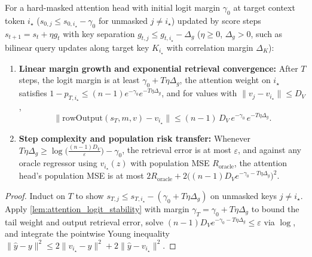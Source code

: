 \begin{lemma}\label{lem:in_context_retrieval}
\leanok
{}
For a hard-masked attention head with initial logit margin $\gamma_0$ at target context token $i_\star$ ($s_{0,j} \le s_{0,i_\star} - \gamma_0$ for unmasked $j\ne i_\star$) updated by score steps $s_{t+1} = s_t + \eta g_t$ with key separation $g_{t,j} \le g_{t,i_\star} - \Delta_g$ ($\eta\ge 0$, $\Delta_g > 0$, such as bilinear query updates along target key $K_{i_\star}$ with correlation margin $\Delta_K$):
\begin{enumerate}
\item \textbf{Linear margin growth and exponential retrieval convergence:} After $T$ steps, the logit margin is at least $\gamma_0 + T\eta\Delta_g$, the attention weight on $i_\star$ satisfies $1 - p_{T,i_\star} \le (n-1)e^{-\gamma_0}e^{-T\eta\Delta_g}$, and for values with $\|v_j - v_{i_\star}\|\le D_V$,
\[
\bigl\|\mathrm{rowOutput}(s_T, m, v) - v_{i_\star}\bigr\| \le (n-1)\,D_V\,e^{-\gamma_0}\,e^{-T\eta\Delta_g}.
\]
\item \textbf{Step complexity and population risk transfer:} Whenever $T\eta\Delta_g \ge \log\bigl(\frac{(n-1)D_V}{\varepsilon}\bigr) - \gamma_0$, the retrieval error is at most $\varepsilon$, and against any oracle regressor using $v_{i_\star}(z)$ with population MSE $R_{\mathrm{oracle}}$, the attention head's population MSE is at most $2 R_{\mathrm{oracle}} + 2\bigl((n-1)D_V e^{-\gamma_0 - T\eta\Delta_g}\bigr)^2$.
\end{enumerate}
\end{lemma}
\begin{proof}
\leanok
Induct on $T$ to show $s_{T,j} \le s_{T,i_\star} - (\gamma_0 + T\eta\Delta_g)$ on unmasked keys $j\ne i_\star$. Apply \cref{lem:attention_logit_stability} with margin $\gamma_T = \gamma_0 + T\eta\Delta_g$ to bound the tail weight and output retrieval error, solve $(n-1)D_V e^{-\gamma_0 - T\eta\Delta_g} \le \varepsilon$ via $\log$, and integrate the pointwise Young inequality $\|\hat{y} - y\|^2 \le 2\|v_{i_\star} - y\|^2 + 2\|\hat{y} - v_{i_\star}\|^2$.
\end{proof}

